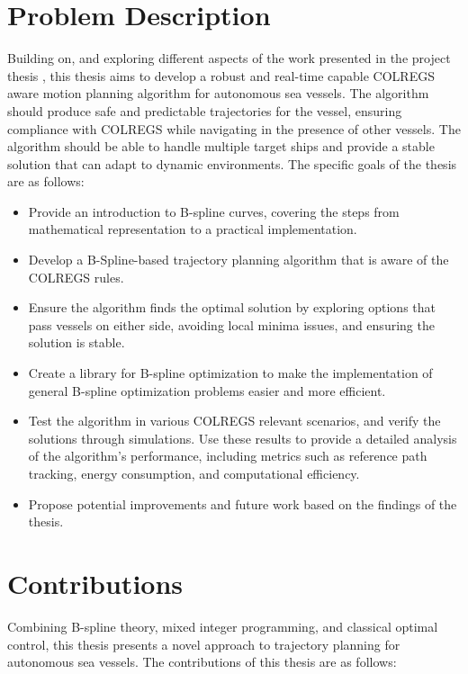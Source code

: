 \section{Problem Description}
Building on, and exploring different aspects of the work presented in the project thesis \citet{prosjektoppgave}, this thesis aims to develop a robust and real-time capable \acrshort{COLREGS} aware motion planning algorithm for autonomous sea vessels. The algorithm should produce safe and predictable trajectories for the vessel, ensuring compliance with \acrshort{COLREGS} while navigating in the presence of other vessels. The algorithm should be able to handle multiple target ships and provide a stable solution that can adapt to dynamic environments. The specific goals of the thesis are as follows:
\begin{itemize}
    \item Provide an introduction to B-spline curves, covering the steps from mathematical representation to a practical implementation.
    \item Develop a B-Spline-based trajectory planning algorithm that is aware of the COLREGS rules.
    \item Ensure the algorithm finds the optimal solution by exploring options that pass vessels on either side, avoiding local minima issues, and ensuring the solution is stable.
    \item Create a library for B-spline optimization to make the implementation of general B-spline optimization problems easier and more efficient.
    \item Test the algorithm in various COLREGS relevant scenarios, and verify the solutions through simulations. Use these results to provide a detailed analysis of the algorithm's performance, including metrics such as reference path tracking, energy consumption, and computational efficiency.
    \item Propose potential improvements and future work based on the findings of the thesis.
\end{itemize}


\section{Contributions}

Combining B-spline theory, mixed integer programming, and classical optimal control, this thesis presents a novel approach to trajectory planning for autonomous sea vessels. The contributions of this thesis are as follows:

